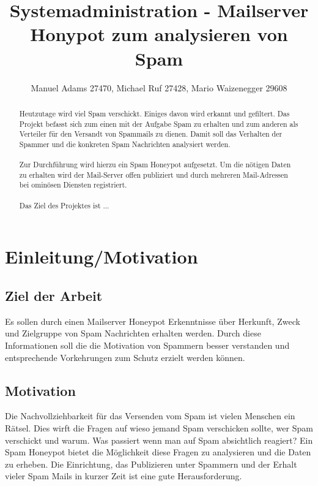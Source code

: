 \documentclass[a4paper,11pt,singlespacing]{article}
\begin{document}

\title{Systemadministration - Mailserver Honypot zum analysieren von Spam}
\author{Manuel Adams 27470, Michael Ruf 27428, Mario Waizenegger 29608}
\maketitle
\begin{abstract}
Heutzutage wird viel Spam verschickt. Einiges davon wird erkannt und gefiltert.
Das Projekt befasst sich zum einen mit der Aufgabe Spam zu erhalten und zum anderen als Verteiler für den Versandt von Spammails zu dienen.
Damit soll das Verhalten der Spammer und die konkreten Spam Nachrichten analysiert werden.
\\\\
Zur Durchführung wird hierzu ein Spam Honeypot aufgesetzt.
Um die nötigen Daten zu erhalten wird der Mail-Server offen publiziert und durch mehreren Mail-Adressen bei ominösen Diensten registriert.
\\\\
Das Ziel des Projektes ist ...\color{red}{TODO}
\end{abstract}

\newpage

\tableofcontents

\newpage
{}

\section{Einleitung/Motivation}\label{sec:Einleitung}

	\subsection{Ziel der Arbeit}\label{sec:Ziel}
		Es sollen durch einen Mailserver Honeypot Erkenntnisse über Herkunft, Zweck und Zielgruppe von Spam Nachrichten erhalten werden.
		Durch diese Informationen soll die die Motivation von Spammern besser verstanden und entsprechende Vorkehrungen zum Schutz erzielt werden können.

	\subsection{Motivation}\label{sec:Motivation}
		Die Nachvollziehbarkeit für das Versenden vom Spam ist vielen Menschen ein Rätsel.
		Dies wirft die Fragen auf wieso jemand Spam verschicken sollte, wer Spam verschickt und warum.
		Was passiert wenn man auf Spam absichtlich reagiert?
		Ein Spam Honeypot bietet die Möglichkeit diese Fragen zu analysieren und die Daten zu erheben.
		Die Einrichtung, das Publizieren unter Spammern und der Erhalt vieler Spam Mails in kurzer Zeit ist eine gute Herausforderung.
	
\end{document}
